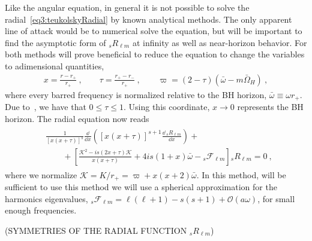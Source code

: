 Like the angular equation, in general it is not possible to solve the radial~\eqref{eq3:teukolskyRadial} by known analytical methods.
The only apparent line of attack would be to numerical solve the equation, but will be important to find the asymptotic form of ${}_{s}R_{\ell m}$ at infinity as well as near-horizon behavior. 
For both methods will prove beneficial to reduce the equation to change the variables to adimensional quantities,
\begin{align}
    x = \frac{r - r_{+}}{r_{+}} ~,\qquad \tau = \frac{r_{+} - r_{-}}{r_{+}} ~,\qquad \varpi = (2-\tau)( \bar\omega - m \bar{\Omega}_H) ~,
\end{align}
where every barred frequency is normalized relative to the BH horizon, $\bar\omega\equiv\omega r_{+}$. Due to~, we have that $0\le\tau\le 1$. Using this coordinate, $x\to0$ represents the BH horizon. The radial equation now reads
\begin{align}
    \begin{split}
        & \frac{1}{[x(x+\tau)]^s} \frac{\dd}{\dd x}\left( [x(x+\tau)]^{s+1} \frac{\dd \,{}_{s}R_{\ell m}}{\dd x} \right) + \\
        &\qquad + \left[ \frac{\mathscr{K}^2 - i s (2 x+\tau) \mathscr{K}}{x(x+\tau)} + 4 i s (1 + x)\bar{\omega} - {}_{s}\mathscr{F}_{\ell m} \right] {}_{s}R_{\ell m} = 0 ~,
    \end{split}
\end{align}
where we normalize $\mathscr{K} = K/r_{+} = \varpi + x(x+2)\bar{\omega}$. In this method, will be sufficient to use  this method we will use a spherical approximation for the harmonics eigenvalues, ${}_{s}\mathscr{F}_{\ell m} = \ell(\ell+1) - s(s+1) + \mathscr{O}(a\omega)$, for small enough frequencies.

(SYMMETRIES OF THE RADIAL FUNCTION ${}_{s}R_{\ell m}$)

